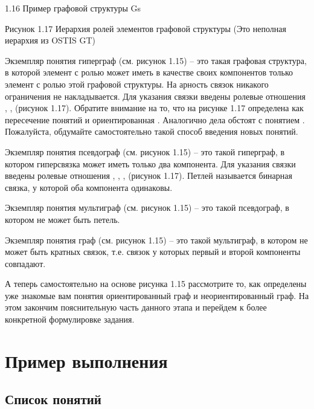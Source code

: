 1.16 Пример графовой структуры Gs
 
Рисунок 1.17 Иерархия ролей элементов графовой структуры (Это неполная иерархия из OSTIS GT)

Экземпляр понятия гиперграф (см. рисунок 1.15) – это такая графовая
структура, в которой элемент с ролью  может иметь в
качестве своих компонентов только элемент с ролью  этой
графовой структуры.  На арность связок никакого ограничения не
накладывается. Для указания связки введены ролевые отношения
, ,  (рисунок
1.17). Обратите внимание на то, что на рисунке 1.17 
определена как пересечение понятий  и
ориентированная . Аналогично дела обстоят с понятием
. Пожалуйста, обдумайте самостоятельно такой способ
введения новых понятий.

Экземпляр понятия псевдограф (см. рисунок 1.15) – это такой гиперграф,
в котором гиперсвязка может иметь только два компонента.  Для указания
связки введены ролевые отношения , ,
,  (рисунок 1.17). Петлей называется бинарная
связка, у которой оба компонента одинаковы.

Экземпляр понятия мультиграф (см. рисунок 1.15) – это такой
псевдограф, в котором не может быть петель.
 
Экземпляр понятия граф (см. рисунок 1.15) – это такой мультиграф, в
котором не может быть кратных связок, т.е. связок у которых первый и
второй компоненты совпадают.

А теперь самостоятельно на основе рисунка 1.15 рассмотрите то, как
определены уже знакомые вам понятия ориентированный граф и
неориентированный граф. На этом закончим пояснительную часть данного
этапа и перейдем к более конкретной формулировке задания.

\newpage

\section{Пример выполнения}
\label{sec:Onto_example}

\subsection{Список понятий}
\label{sec:Onto_ex_concepts}

